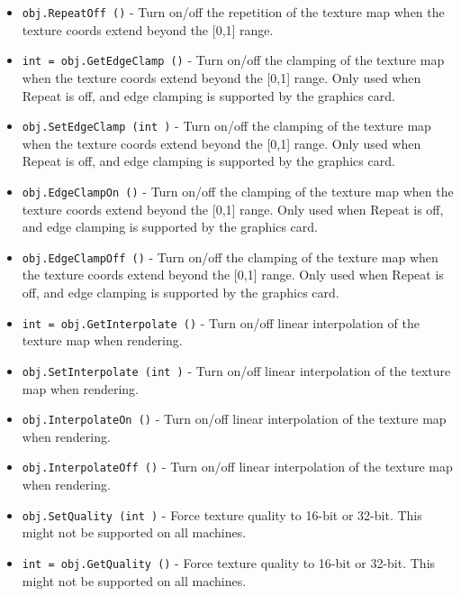 \begin{itemize}
\item  \verb|obj.RepeatOff ()| -  Turn on/off the repetition of the texture map when the texture
 coords extend beyond the [0,1] range.

\item  \verb|int = obj.GetEdgeClamp ()| -  Turn on/off the clamping of the texture map when the texture
 coords extend beyond the [0,1] range.
 Only used when Repeat is off, and edge clamping is supported by
 the graphics card.

\item  \verb|obj.SetEdgeClamp (int )| -  Turn on/off the clamping of the texture map when the texture
 coords extend beyond the [0,1] range.
 Only used when Repeat is off, and edge clamping is supported by
 the graphics card.

\item  \verb|obj.EdgeClampOn ()| -  Turn on/off the clamping of the texture map when the texture
 coords extend beyond the [0,1] range.
 Only used when Repeat is off, and edge clamping is supported by
 the graphics card.

\item  \verb|obj.EdgeClampOff ()| -  Turn on/off the clamping of the texture map when the texture
 coords extend beyond the [0,1] range.
 Only used when Repeat is off, and edge clamping is supported by
 the graphics card.

\item  \verb|int = obj.GetInterpolate ()| -  Turn on/off linear interpolation of the texture map when rendering.

\item  \verb|obj.SetInterpolate (int )| -  Turn on/off linear interpolation of the texture map when rendering.

\item  \verb|obj.InterpolateOn ()| -  Turn on/off linear interpolation of the texture map when rendering.

\item  \verb|obj.InterpolateOff ()| -  Turn on/off linear interpolation of the texture map when rendering.

\item  \verb|obj.SetQuality (int )| -  Force texture quality to 16-bit or 32-bit.
 This might not be supported on all machines.

\item  \verb|int = obj.GetQuality ()| -  Force texture quality to 16-bit or 32-bit.
 This might not be supported on all machines.


\end{itemize}
